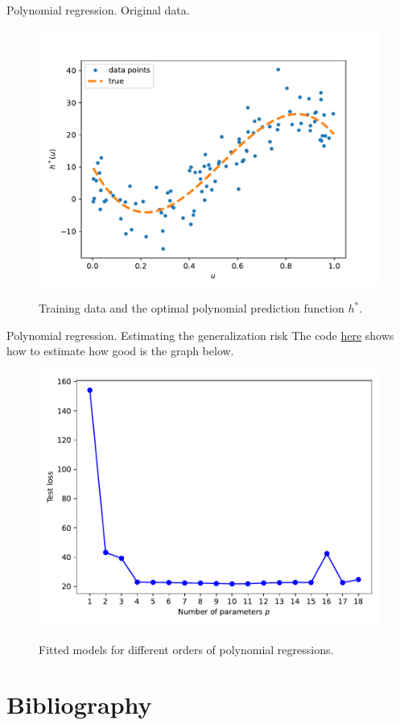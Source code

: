 \documentclass{beamer}
\begin{document}
\begin{frame}{Polynomial regression. Original data.}
  \begin{figure}
    \includegraphics[width=0.7\linewidth]{polydatpy}
    \label{fig:polydatpy}
    \caption{Training data and the optimal polynomial prediction function $h^*$\cite{kroese2020}.}
  \end{figure}
\end{frame}

\begin{frame}{Polynomial regression. Estimating the generalization risk}
    The code \href{https://biocomputing-teaching.github.io/Data-Science-with-Python/code/UNIT3-MC-Methods.html}{here} shows how to estimate how good is the graph below. 
  \begin{figure}
    \includegraphics[width=0.4\linewidth]{MSEpy}
    \label{fig:crossvalpy}
    \caption{Fitted models for different orders of polynomial regressions\cite{kroese2020}.}
  \end{figure}
\end{frame}

\section{Bibliography}


\end{document}
